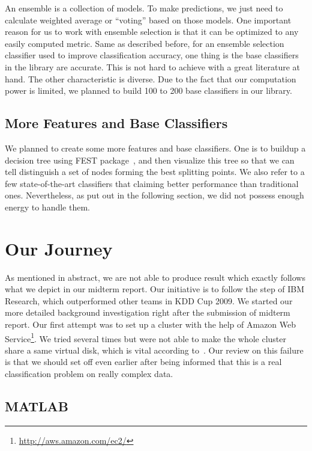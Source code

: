 \documentclass[journal]{IEEEtran}
\begin{document}
An ensemble is a collection of models. To make predictions, we just
need to calculate weighted average or ``voting'' based on those
models. One important reason for us to work with ensemble selection is
that it can be optimized to any easily computed metric. Same as
described before, for an ensemble selection classifier used to improve
classification accuracy, one thing is the base classifiers in the
library are accurate. This is not hard to achieve with a great
literature at hand. The other characteristic is diverse. Due to the
fact that our computation power is limited, we planned to build 100 to
200 base classifiers in our library. 

\subsection{More Features and Base Classifiers}
\label{sec:more-features-base}

We planned to create some more features and base classifiers. One is
to buildup a decision tree using FEST
package~\cite{Caruana:2008:EES:1390156.1390169}, and then visualize
this tree so that we can tell distinguish a set of nodes forming the
best splitting points. We also refer to a few state-of-the-art
classifiers that claiming better performance than traditional
ones. Nevertheless, as put out in the following section, we did not
possess enough energy to handle them.

\section{Our Journey}
\label{sec:revised-proposal}
As mentioned in abstract, we are not able to produce result which
exactly follows what we depict in our midterm report. Our initiative
is to follow the step of IBM Research, which outperformed other teams
in KDD Cup 2009. We started our more detailed background investigation
right after the submission of midterm report. Our first attempt was to
set up a cluster with the help of Amazon Web
Service\footnote{\url{http://aws.amazon.com/ec2/}}. We tried several
times but were not able to make the whole cluster share a same virtual
disk, which is vital according
to~\cite{ref:ensembleselectionnutshell}. Our review on this failure is
that we should set off even earlier after being informed that this is
a real classification problem on really complex data.

\subsection{MATLAB}
\label{sec:matlab}
\end{document}

